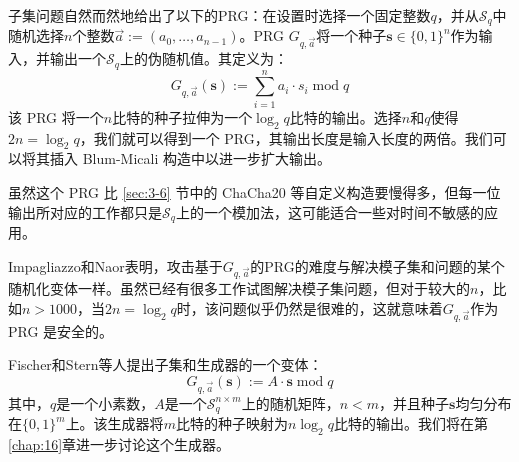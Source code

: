 \begin{snote}[子集和与PRG。]
子集问题自然而然地给出了以下的PRG：在设置时选择一个固定整数$q$，并从$\mathcal{S}_q$中随机选择$n$个整数$\vec{a}:=(a_0,\dots,a_{n-1})$。PRG $G_{q,\vec{a}}$将一个种子$\boldsymbol{s}\in\{0,1\}^n$作为输入，并输出一个$\mathcal{S}_q$上的伪随机值。其定义为：
\[
G_{q,\vec{a}}(\boldsymbol{s}):=\sum_{i=1}^na_i\cdot s_i\;\mathrm{mod}\;q
\]
该 PRG 将一个$n$比特的种子拉伸为一个$\log_2q$比特的输出。选择$n$和$q$使得$2n=\log_2q$，我们就可以得到一个 PRG，其输出长度是输入长度的两倍。我们可以将其插入 Blum-Micali 构造中以进一步扩大输出。

虽然这个 PRG 比 \ref{sec:3-6} 节中的 ChaCha20 等自定义构造要慢得多，但每一位输出所对应的工作都只是$\mathcal{S}_q$上的一个模加法，这可能适合一些对时间不敏感的应用。

Impagliazzo和Naor表明，攻击基于$G_{q,\vec{a}}$的PRG的难度与解决模子集和问题的某个随机化变体一样。虽然已经有很多工作试图解决模子集问题，但对于较大的$n$，比如$n>1000$，当$2n=\log_2q$时，该问题似乎仍然是很难的，这就意味着$G_{q,\vec{a}}$作为 PRG 是安全的。
\end{snote}

\begin{snote}[变体。]
Fischer和Stern等人提出子集和生成器的一个变体：
\[
G_{q,\vec{a}}(\boldsymbol{s}):=A\cdot\boldsymbol{s}\;\mathrm{mod}\;q
\]
其中，$q$是一个小素数，$A$是一个$\mathcal{S}_q^{n\times m}$上的随机矩阵，$n<m$，并且种子$\boldsymbol{s}$均匀分布在$\{0,1\}^m$上。该生成器将$m$比特的种子映射为$n\log_2q$比特的输出。我们将在第\ref{chap:16}章进一步讨论这个生成器。
\end{snote}
















